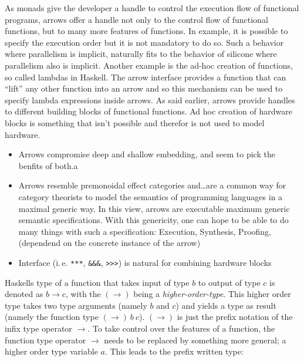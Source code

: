 \documentclass[9pt,final,a4paper,leqno]{article}
\newcommand{\hs}[1]{\mbox{\lstinline[basicstyle=\color{textgray}]!#1!}}
\begin{document}
\par
As monads give the developer a handle to control the execution flow of functional programs, arrows offer a handle not only to the control
flow of functional functions, but to many more features of functions. In example, it is possible to specify the execution order but it is
not mandatory to do so. Such a behavior where parallelism is implicit, naturally fits to the behavior of silicone where parallelism also is
implicit. Another example is the ad-hoc creation of functions, so called lambdas in Haskell. The arrow interface provides a function that
can ``lift'' any other function into an arrow and so this mechanism can be used to specify lambda expressions inside arrows. As said
earlier, arrows provide handles to different building blocks of functional functions. Ad hoc creation of hardware blocks is something that
isn't possible and therefor is not used to model hardware. %

\begin{itemize}
  \item Arrows compromise deep and shallow embedding, and seem to pick the benfits of both.a
  \item Arrows resemble premonoidal effect categories and\ldots   are a common way for category theorists to model the
  semantics of programming languages in a maximal generic way. In this view, arrows are executable maximum generic
  semantic specifications. With this genericity, one can hope to be able to do many things with such a specification:
  Execution, Synthesis, Proofing, (dependend on the concrete instance of the arrow)
  \item Interface (i.\,e. \hs{***}, \hs{&&&}, \hs{>>>}) is natural for combining hardware blocks
\end{itemize}

\par
Haskells type of a function that takes input of type $b$ to output of type $c$ is denoted as $b \rightarrow c$, with the $(\rightarrow)$
being a \emph{higher-order-type}. This higher order type takes two type arguments (namely $b$ and $c$) and yields a type as result (namely
the function type $(\rightarrow)\ b\ c$). $(\rightarrow)$ is just the prefix notation of the infix type operator $\rightarrow$. To take
control over the features of a function, the function type operator $\rightarrow$ needs to be replaced by something more general; a higher
order type variable $a$. This leads to the prefix written type:
\end{document}
